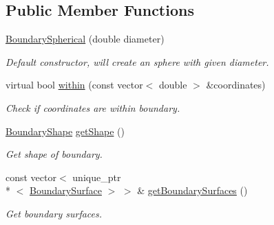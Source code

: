 \subsection*{Public Member Functions}
\begin{DoxyCompactItemize}
\item 
\hyperlink{classBoundarySpherical_ae94c30c1bbb81df2cb57aef65eecfa10}{Boundary\+Spherical} (double diameter)
\begin{DoxyCompactList}\small\item\em Default constructor, will create an sphere with given diameter. \end{DoxyCompactList}\item 
virtual bool \hyperlink{classBoundarySpherical_a653f35719ff4baec5848053093978ee9}{within} (const vector$<$ double $>$ \&coordinates)
\begin{DoxyCompactList}\small\item\em Check if coordinates are within boundary. \end{DoxyCompactList}\item 
\hyperlink{Boundary_8h_a0099b369f2bc119c1b54728734b41132}{Boundary\+Shape} \hyperlink{classBoundary_a20d2121527b207eed35f6719393e3499}{get\+Shape} ()
\begin{DoxyCompactList}\small\item\em Get shape of boundary. \end{DoxyCompactList}\item 
const vector$<$ unique\+\_\+ptr\\*
$<$ \hyperlink{classBoundarySurface}{Boundary\+Surface} $>$ $>$ \& \hyperlink{classBoundary_acfa6640f65c432e339108887913539eb}{get\+Boundary\+Surfaces} ()
\begin{DoxyCompactList}\small\item\em Get boundary surfaces. \end{DoxyCompactList}\end{DoxyCompactItemize}
